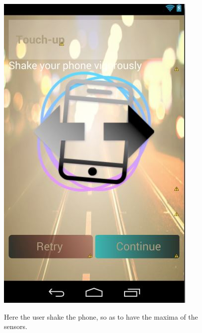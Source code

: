 \begin{figure}[h]
	\centering
	\includegraphics[height=0.35\textheight]{fig01/s_shake}
	\label{fig:RHP04}

Here the user shake the phone, so as to have the maxima of the sensors.

\end{figure}
